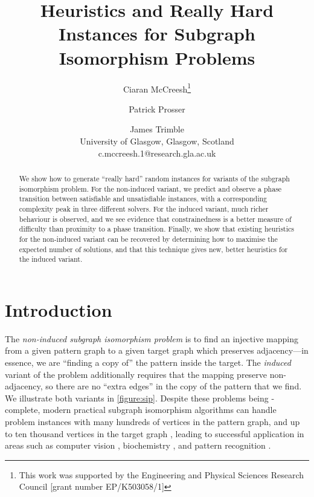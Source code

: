 \documentclass[letterpaper]{article}
\title{Heuristics and Really Hard Instances for Subgraph Isomorphism Problems}
\author{Ciaran McCreesh\thanks{This work was supported by the Engineering and Physical Sciences
    Research Council [grant number EP/K503058/1]} \and Patrick Prosser \and James Trimble \\
University of Glasgow, Glasgow, Scotland \\
c.mccreesh.1@research.gla.ac.uk}
\begin{document}
\maketitle

\begin{abstract}
    We show how to generate ``really hard'' random instances for variants of the subgraph
    isomorphism problem. For the non-induced variant, we predict and observe a phase
    transition between satisfiable and unsatisfiable instances, with a corresponding complexity peak
    in three different solvers. For the induced variant, much richer behaviour is observed, and we
    see evidence that constrainedness is a better measure of difficulty than proximity to a phase
    transition. Finally, we show that existing heuristics for the non-induced variant can be
    recovered by determining how to maximise the expected number of solutions, and that this
    technique gives new, better heuristics for the induced variant.
\end{abstract}

\section{Introduction}

The \emph{non-induced subgraph isomorphism problem} is to find an injective mapping from a given
pattern graph to a given target graph which preserves adjacency---in essence, we are ``finding a
copy of'' the pattern inside the target. The \emph{induced} variant of the problem additionally
requires that the mapping preserve non-adjacency, so there are no ``extra edges'' in the copy of the
pattern that we find. We illustrate both variants in \cref{figure:sip}.
Despite these problems being \NP-complete, modern practical subgraph isomorphism algorithms can
handle problem instances with many hundreds of vertices in the pattern graph, and up to ten thousand
vertices in the target graph \citep{Cordella:2004,Solnon:2010,Audemard:2014,McCreesh:2015}, leading
to successful application in areas such as computer
vision \citep{Damiand:2011,Solnon:2015}, biochemistry \citep{Giugno:2013}, and pattern recognition
\citep{Conte:2004}.
\end{document}
